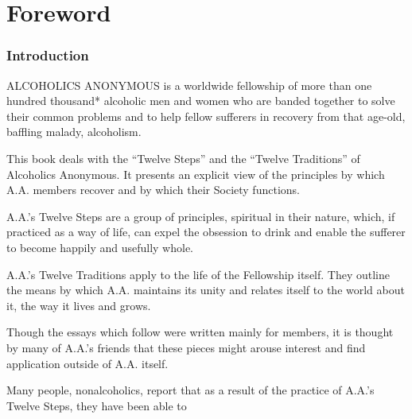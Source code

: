 
\chapter{Foreword}

\subsection{Introduction}

ALCOHOLICS ANONYMOUS is a worldwide fellowship 
of more than one hundred thousand* alcoholic men and women 
who are banded together to solve their common problems 
and to help fellow sufferers in recovery from
that age-old, baffling malady, alcoholism.

This  book deals  with  the “Twelve Steps” 
and the “Twelve Traditions” of Alcoholics Anonymous.
It presents an explicit view of the principles by which A.A. members recover 
and by which their Society functions.

A.A.'s Twelve Steps are a group of principles, spiritual in their nature, 
which, if practiced as a way of life, can expel the obsession to drink 
and enable the sufferer to become happily and usefully whole.

A.A.'s Twelve Traditions apply to the life of the Fellowship itself. 
They outline the means by which A.A. maintains its unity 
and relates itself to the world about it, 
the way it lives and grows.

Though the essays which follow were written mainly for members, 
it is thought by many of A.A.'s friends that these pieces 
might arouse interest and find application outside of A.A. itself.

Many people, nonalcoholics, report that as a result of the practice of A.A.'s Twelve Steps, 
they have been able to


